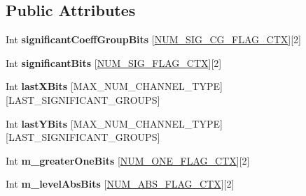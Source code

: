 \subsection*{Public Attributes}
\begin{DoxyCompactItemize}
\item 
\mbox{\label{structest_bits_sbac_struct_a93d160dbbb7c4e9ada68c8d01b7d2ed7}} 
Int {\bfseries significant\+Coeff\+Group\+Bits} \mbox{[}\hyperlink{_context_tables_8h_a95362f072f2eefa97ebac51d3e01263e}{N\+U\+M\+\_\+\+S\+I\+G\+\_\+\+C\+G\+\_\+\+F\+L\+A\+G\+\_\+\+C\+TX}\mbox{]}\mbox{[}2\mbox{]}
\item 
\mbox{\label{structest_bits_sbac_struct_a1ddcf0fb30662b8f25fd4f4aa547efab}} 
Int {\bfseries significant\+Bits} \mbox{[}\hyperlink{_context_tables_8h_a0607d830ae7ae04b190ab90bdeaefc5f}{N\+U\+M\+\_\+\+S\+I\+G\+\_\+\+F\+L\+A\+G\+\_\+\+C\+TX}\mbox{]}\mbox{[}2\mbox{]}
\item 
\mbox{\label{structest_bits_sbac_struct_a562f15a1bd86a339c2bdfdb431c62f3f}} 
Int {\bfseries last\+X\+Bits} \mbox{[}M\+A\+X\+\_\+\+N\+U\+M\+\_\+\+C\+H\+A\+N\+N\+E\+L\+\_\+\+T\+Y\+PE\mbox{]}\mbox{[}L\+A\+S\+T\+\_\+\+S\+I\+G\+N\+I\+F\+I\+C\+A\+N\+T\+\_\+\+G\+R\+O\+U\+PS\mbox{]}
\item 
\mbox{\label{structest_bits_sbac_struct_af83a80e4ff2064c99000908062931ca2}} 
Int {\bfseries last\+Y\+Bits} \mbox{[}M\+A\+X\+\_\+\+N\+U\+M\+\_\+\+C\+H\+A\+N\+N\+E\+L\+\_\+\+T\+Y\+PE\mbox{]}\mbox{[}L\+A\+S\+T\+\_\+\+S\+I\+G\+N\+I\+F\+I\+C\+A\+N\+T\+\_\+\+G\+R\+O\+U\+PS\mbox{]}
\item 
\mbox{\label{structest_bits_sbac_struct_aafb182b5a8da4b717eb05e8e738bb81e}} 
Int {\bfseries m\+\_\+greater\+One\+Bits} \mbox{[}\hyperlink{_context_tables_8h_a6d9111fbd577c4835158707c5ac14a9f}{N\+U\+M\+\_\+\+O\+N\+E\+\_\+\+F\+L\+A\+G\+\_\+\+C\+TX}\mbox{]}\mbox{[}2\mbox{]}
\item 
\mbox{\label{structest_bits_sbac_struct_a045b71f97120c4988ad5688ba9b62edb}} 
Int {\bfseries m\+\_\+level\+Abs\+Bits} \mbox{[}\hyperlink{_context_tables_8h_aca5bcfa2258b46bb400d5fb185279ad1}{N\+U\+M\+\_\+\+A\+B\+S\+\_\+\+F\+L\+A\+G\+\_\+\+C\+TX}\mbox{]}\mbox{[}2\mbox{]}

\end{DoxyCompactItemize}
